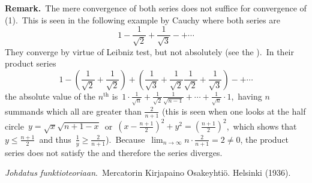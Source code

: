 \documentclass[12pt]{article}
\theoremstyle{definition}
\begin{document}
\textbf{Remark.}\, The mere convergence of both series does not 
suffice for convergence of (1).\, This is seen in the following 
example by Cauchy where both series are 
  $$1\!-\!\frac{1}{\sqrt{2}}\!+\!\frac{1}{\sqrt{3}}\!-+\cdots$$
They converge by virtue of Leibniz test, but not absolutely (see the ).\, In their product series
 $$1\!-\!(\frac{1}{\sqrt{2}}\!+\!\frac{1}{\sqrt{2}})\!+\!(\frac{1}{\sqrt{3}}\!+\!\frac{1}{\sqrt{2}}\frac{1}{\sqrt{2}}\!+\!\frac{1}{\sqrt{3}})\!-+\cdots$$
the absolute value of the $n^\mathrm{th}$  is\,  $1\!\cdot\!\frac{1}{\sqrt{n}}\!+\!\frac{1}{\sqrt{2}}\frac{1}{\sqrt{n-1}}\!+\cdots
+\frac{1}{\sqrt{n}}\!\cdot1\!$,\, having $n$ summands which all are greater than $\frac{2}{n+1}$ (this is seen when one looks at the half circle\, $y = \sqrt{x}\sqrt{n\!+\!1\!-\!x}$\, or\, $(x\!-\!\frac{n+1}{2})^2\!+\!y^2 = (\frac{n+1}{2})^2$,\, which shows that\, $y \leq \frac{n+1}{2}$\, and thus\, $\frac{1}{y} \geq \frac{2}{n+1}$).\, Because\, $\lim_{n\to\infty}n\cdot\frac{2}{n+1} = 2 \neq 0$, the product series does not satisfy the  and therefore the series diverges.


\begin{thebibliography}{8}
 {\it Johdatus funktioteoriaan}. \,Mercatorin Kirjapaino Osakeyhti\"o. Helsinki (1936).
\end{thebibliography}
\end{document}

